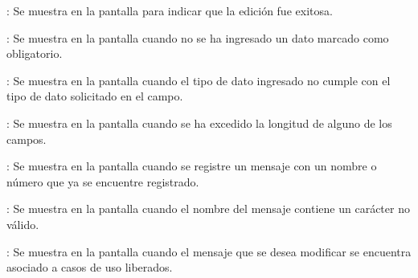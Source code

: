 \begin{Citemize}
	\item {}: Se muestra en la pantalla  para indicar que la edición fue exitosa.
	\item {}: Se muestra en la pantalla  cuando no se ha ingresado un dato marcado como obligatorio.
	\item {}: Se muestra en la pantalla  cuando el tipo de dato ingresado no cumple con el tipo de dato solicitado en el campo.
	\item {}: Se muestra en la pantalla  cuando se ha excedido la longitud de alguno de los campos.
	\item {}: Se muestra en la pantalla  cuando se registre un mensaje con un nombre o número que ya se encuentre registrado.
	\item {}: Se muestra en la pantalla  cuando el nombre del mensaje contiene un carácter no válido.
	\item {}: Se muestra en la pantalla  cuando el mensaje que se desea modificar se encuentra asociado a casos de uso liberados.
\end{Citemize}
